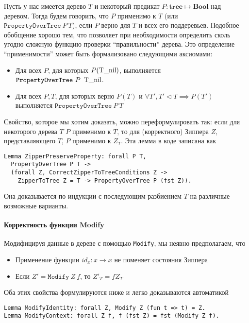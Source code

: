 Пусть у нас имеется дерево $T$ и некоторый предикат $P : \textbf{tree} \mapsto \textbf{Bool}$ над деревом. Тогда будем говорить, что $P$ применимо к $T$ (или $\texttt{PropertyOverTree}\ P\ T$), если $P$ верно для $T$ и всех его поддеревьев. Подобное обобщение хорошо тем, что позволяет при необходимости определить сколь угодно сложную функцию проверки ``правильности'' дерева. Это определение ``применимости'' может быть формализовано следующими аксиомами:

\begin{itemize}
\item Для всех $P$, для которых $P(\operatorname{T\_nil})$, выполняется $\texttt{PropertyOverTree}\ P\ \btnil$.
\item Для всех $P, T$, для которых верно $P(T)$ и $\forall T', T' \triangleleft T \implies P(T')$ выполняется $\texttt{PropertyOverTree}\ P\ T$
\end{itemize}

Свойство, которое мы хотим доказать, можно переформулировать так: если для некоторого дерева $T$ $P$ применимо к $T$, то для (корректного) Зиппера $Z$, представляющего $T$, $P$ применимо к $Z_T$. Эта лемма в коде записана как
\begin{Verbatim}[fontsize=\small]
Lemma ZipperPreserveProperty: forall P T,
  PropertyOverTree P T ->
  (forall Z, CorrectZipperToTreeConditions Z ->
    ZipperToTree Z = T -> PropertyOverTree P (fst Z)).
\end{Verbatim}
Она доказывается по индукции с последующим разбиением $T$ на различные возможные варианты.

\paragraph{Корректность функции Modify}

Модифицируя данные в дереве с помощью \texttt{Modify}, мы неявно предполагаем, что
\begin{itemize}
\item Применение функции $id_x : x \rightarrow x$ не поменяет состояния Зиппера
\item Если $Z' = \texttt{Modify}\ Z\ f$, то $Z'_T = f Z_T$
\end{itemize}

Оба этих свойства формулируются ниже и легко доказываются автоматикой \tcoq
\begin{Verbatim}[fontsize=\small]
Lemma ModifyIdentity: forall Z, Modify Z (fun t => t) = Z.
Lemma ModifyContext: forall Z f, f (fst Z) = fst (Modify Z f).
\end{Verbatim}

